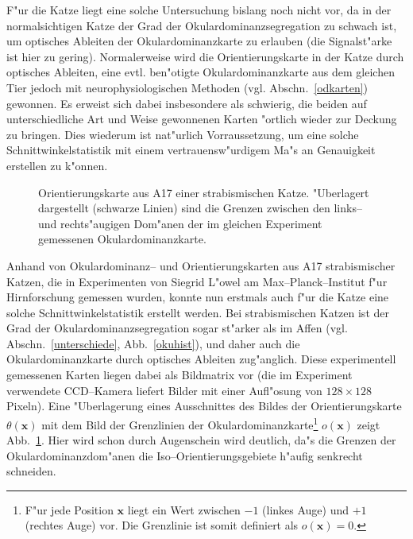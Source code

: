 F"ur die Katze liegt eine solche Untersuchung bislang noch nicht vor, da in
der normalsichtigen Katze der Grad der Okulardominanzsegregation zu schwach
ist, um optisches Ableiten der Okulardominanzkarte zu erlauben (die
Signalst"arke ist hier zu gering). Normalerweise wird die
Orientierungskarte in der Katze durch optisches Ableiten, eine
evtl. ben"otigte Okulardominanzkarte aus dem gleichen Tier jedoch mit
neurophysiologischen Methoden (vgl. Abschn.~\ref{odkarten}) gewonnen. Es
erweist sich dabei insbesondere als schwierig, die beiden auf
unterschiedliche Art und Weise gewonnenen Karten "ortlich wieder zur
Deckung zu bringen. Dies wiederum ist nat"urlich Vorraussetzung, um eine
solche Schnittwinkelstatistik mit einem vertrauensw"urdigem Ma"s an
Genauigkeit erstellen zu k"onnen.

\begin{figure}[t]
\begin{center}
\end{center}
\caption{Orientierungskarte aus A17 einer strabismischen Katze. "Uberlagert
dargestellt (schwarze Linien) sind die Grenzen zwischen den links-- und
rechts"augigen Dom"anen der im gleichen Experiment gemessenen
Okulardominanzkarte.}
\label{odop_pict}
\end{figure}

Anhand von Okulardominanz-- und Orientierungskarten aus A17 strabismischer
Katzen, die in Experimenten von Siegrid L"owel am Max--Planck--Institut
f"ur Hirnforschung gemessen wurden, konnte nun erstmals auch f"ur die Katze
eine solche Schnittwinkelstatistik erstellt werden. Bei strabismischen
Katzen ist der Grad der Okulardominanzsegregation sogar st"arker als im
Affen (vgl. Abschn.~\ref{unterschiede}, Abb.~\ref{okuhist}), und daher auch
die Okulardominanzkarte durch optisches Ableiten zug"anglich. Diese
experimentell gemessenen Karten liegen dabei als Bildmatrix vor (die im
Experiment verwendete CCD--Kamera liefert Bilder mit einer Aufl"osung von
$128\times 128$ Pixeln). Eine "Uberlagerung eines Ausschnittes des Bildes
der Orientierungskarte $\theta(\mathbf{x})$ mit dem Bild der Grenzlinien
der Okulardominanzkarte\footnote{F"ur jede Position $\mathbf{x}$ liegt ein
Wert zwischen $-1$ (linkes Auge) und $+1$ (rechtes Auge) vor. Die
Grenzlinie ist somit definiert als $o(\mathbf{x}) = 0$.} $o(\mathbf{x})$
zeigt Abb.~\ref{odop_pict}. Hier wird schon durch Augenschein wird
deutlich, da"s die Grenzen der Okulardominanzdom"anen die
Iso--Orientierungsgebiete h"aufig senkrecht schneiden.
\setcounter{footnote}{1}

